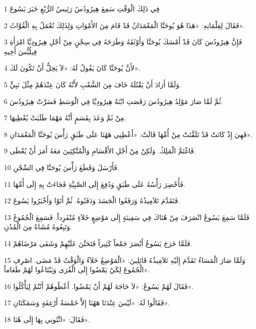 \par 1 فِي ذَلِكَ الْوَقْتِ سَمِعَ هِيرُودُسُ رَئِيسُ الرُّبْعِ خَبَرَ يَسُوعَ
\par 2 فَقَالَ لِغِلْمَانِهِ: «هَذَا هُوَ يُوحَنَّا الْمَعْمَدَانُ قَدْ قَامَ مِنَ الأَمْوَاتِ وَلِذَلِكَ تُعْمَلُ بِهِ الْقُوَّاتُ».
\par 3 فَإِنَّ هِيرُودُسَ كَانَ قَدْ أَمْسَكَ يُوحَنَّا وَأَوْثَقَهُ وَطَرَحَهُ فِي سِجْنٍ مِنْ أَجْلِ هِيرُودِيَّا امْرَأَةِ فِيلُبُّسَ أَخِيهِ
\par 4 لأَنَّ يُوحَنَّا كَانَ يَقُولُ لَهُ: «لاَ يَحِلُّ أَنْ تَكُونَ لَكَ».
\par 5 وَلَمَّا أَرَادَ أَنْ يَقْتُلَهُ خَافَ مِنَ الشَّعْبِ لأَنَّهُ كَانَ عِنْدَهُمْ مِثْلَ نَبِيٍّ.
\par 6 ثُمَّ لَمَّا صَارَ مَوْلِدُ هِيرُودُسَ رَقَصَتِ ابْنَةُ هِيرُودِيَّا فِي الْوَسَطِ فَسَرَّتْ هِيرُودُسَ.
\par 7 مِنْ ثَمَّ وَعَدَ بِقَسَمٍ أَنَّهُ مَهْمَا طَلَبَتْ يُعْطِيهَا.
\par 8 فَهِيَ إِذْ كَانَتْ قَدْ تَلَقَّنَتْ مِنْ أُمِّهَا قَالَتْ: «أَعْطِنِي هَهُنَا عَلَى طَبَقٍ رَأْسَ يُوحَنَّا الْمَعْمَدَانِ».
\par 9 فَاغْتَمَّ الْمَلِكُ. وَلَكِنْ مِنْ أَجْلِ الأَقْسَامِ وَالْمُتَّكِئِينَ مَعَهُ أَمَرَ أَنْ يُعْطَى.
\par 10 فَأَرْسَلَ وَقَطَعَ رَأْسَ يُوحَنَّا فِي السِّجْنِ.
\par 11 فَأُحْضِرَ رَأْسُهُ عَلَى طَبَقٍ وَدُفِعَ إِلَى الصَّبِيَّةِ فَجَاءَتْ بِهِ إِلَى أُمِّهَا.
\par 12 فَتَقَدَّمَ تَلاَمِيذُهُ وَرَفَعُوا الْجَسَدَ وَدَفَنُوهُ. ثُمَّ أَتَوْا وَأَخْبَرُوا يَسُوعَ.
\par 13 فَلَمَّا سَمِعَ يَسُوعُ انْصَرَفَ مِنْ هُنَاكَ فِي سَفِينَةٍ إِلَى مَوْضِعٍ خَلاَءٍ مُنْفَرِداً. فَسَمِعَ الْجُمُوعُ وَتَبِعُوهُ مُشَاةً مِنَ الْمُدُنِ.
\par 14 فَلَمَّا خَرَجَ يَسُوعُ أَبْصَرَ جَمْعاً كَثِيراً فَتَحَنَّنَ عَلَيْهِمْ وَشَفَى مَرْضَاهُمْ.
\par 15 وَلَمَّا صَارَ الْمَسَاءُ تَقَدَّمَ إِلَيْهِ تَلاَمِيذُهُ قَائِلِينَ: «الْمَوْضِعُ خَلاَءٌ وَالْوَقْتُ قَدْ مَضَى. اصْرِفِ الْجُمُوعَ لِكَيْ يَمْضُوا إِلَى الْقُرَى وَيَبْتَاعُوا لَهُمْ طَعَاماً».
\par 16 فَقَالَ لَهُمْ يَسُوعُ: «لاَ حَاجَةَ لَهُمْ أَنْ يَمْضُوا. أَعْطُوهُمْ أَنْتُمْ لِيَأْكُلُوا».
\par 17 فَقَالُوا لَهُ: «لَيْسَ عِنْدَنَا هَهُنَا إِلاَّ خَمْسَةُ أَرْغِفَةٍ وَسَمَكَتَانِ».
\par 18 فَقَالَ: «ائْتُونِي بِهَا إِلَى هُنَا».
